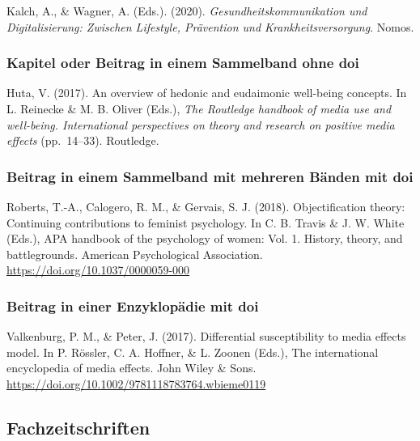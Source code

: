 \documentclass[
  letterpaper,
  DIV=11]{scrreprt}
\begin{document}
Kalch, A., \& Wagner, A. (Eds.). (2020). \emph{Gesundheitskommunikation
und Digitalisierung: Zwischen Lifestyle, Prävention und
Krankheitsversorgung}. Nomos.

\subsubsection{Kapitel oder Beitrag in einem Sammelband \textbar{} ohne
doi}\label{kapitel-oder-beitrag-in-einem-sammelband-ohne-doi}

Huta, V. (2017). An overview of hedonic and eudaimonic well-being
concepts. In L. Reinecke \& M. B. Oliver (Eds.), \emph{The Routledge
handbook of media use and well-being. International perspectives on
theory and research on positive media effects} (pp.~14--33). Routledge.

\subsubsection{Beitrag in einem Sammelband mit mehreren Bänden
\textbar{} mit
doi}\label{beitrag-in-einem-sammelband-mit-mehreren-buxe4nden-mit-doi}

Roberts, T.-A., Calogero, R. M., \& Gervais, S. J. (2018).
Objectification theory: Continuing contributions to feminist psychology.
In C. B. Travis \& J. W. White (Eds.), APA handbook of the psychology of
women: Vol. 1. History, theory, and battlegrounds. American
Psychological Association. \url{https://doi.org/10.1037/0000059-000}

\subsubsection{Beitrag in einer Enzyklopädie \textbar{} mit
doi}\label{beitrag-in-einer-enzyklopuxe4die-mit-doi}

Valkenburg, P. M., \& Peter, J. (2017). Differential susceptibility to
media effects model. In P. Rössler, C. A. Hoffner, \& L. Zoonen (Eds.),
The international encyclopedia of media effects. John Wiley \& Sons.
\url{https://doi.org/10.1002/9781118783764.wbieme0119}

\subsection{Fachzeitschriften}\label{sec-fachzeitschriften}
\end{document}
